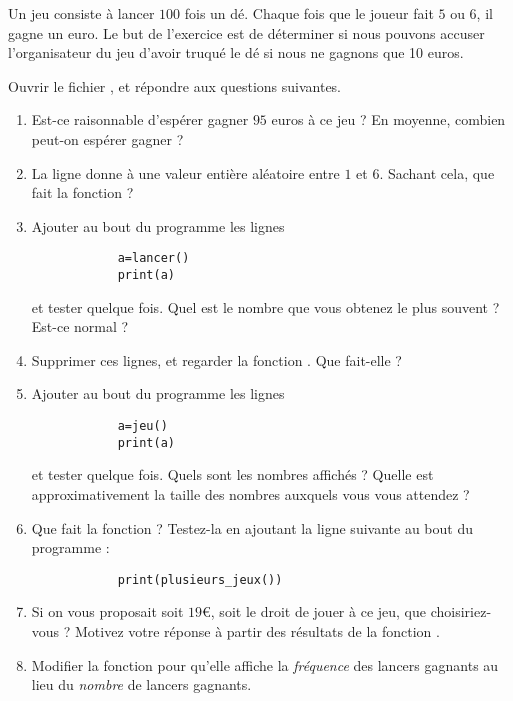 
\begin{exercice}\label{exosmath-0338}

    Un jeu consiste à lancer \( 100\) fois un dé. Chaque fois que le joueur fait \( 5\) ou \( 6\), il gagne un euro. Le but de l'exercice est de déterminer si nous pouvons accuser l'organisateur du jeu d'avoir truqué le dé si nous ne gagnons que 10 euros.

    Ouvrir le fichier , et répondre aux questions suivantes.
    \begin{enumerate}
        \item
            Est-ce raisonnable d'espérer gagner \( 95\) euros à ce jeu ? En moyenne, combien peut-on espérer gagner ?
        \item

          La ligne  donne à  une valeur entière aléatoire entre \( 1\) et \( 6\). Sachant cela, que fait la fonction  ?
        \item
            Ajouter au bout du programme les lignes 
            \begin{verbatim}
            a=lancer()
            print(a)
            \end{verbatim}
            et tester quelque fois. Quel est le nombre que vous obtenez le plus souvent ? Est-ce normal ?
        \item
            Supprimer ces lignes, et regarder la fonction . Que fait-elle ? 
        \item
            Ajouter au bout du programme les lignes 
            \begin{verbatim}
            a=jeu()
            print(a)
            \end{verbatim}
            et tester quelque fois. Quels sont les nombres affichés ? Quelle est approximativement la taille des nombres auxquels vous vous attendez ?
        \item
            Que fait la fonction  ? Testez-la en ajoutant la ligne suivante au bout du programme :
            \begin{verbatim}
            print(plusieurs_jeux())
            \end{verbatim}
        \item
            Si on vous proposait soit \( 19\)€, soit le droit de jouer à ce jeu, que choisiriez-vous ? Motivez votre réponse à partir des résultats de la fonction .
        \item
            Modifier la fonction  pour qu'elle affiche la \emph{fréquence} des lancers gagnants au lieu du \emph{nombre} de lancers gagnants.
    \end{enumerate}

\end{exercice}
